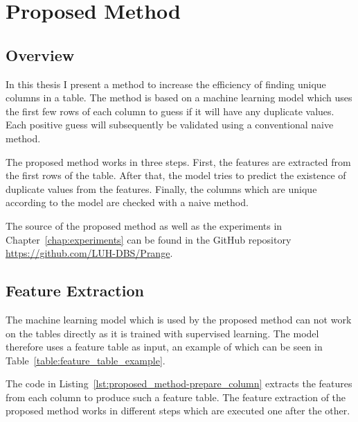\chapter{Proposed Method}\label{chap:proposed_method}
\section{Overview}\label{sec:overview}
In this thesis I present a method to increase the efficiency of finding unique columns in a table. The method is based on a machine learning model which uses the first few rows of each column to guess if it will have any duplicate values. Each positive guess will subsequently be validated using a conventional naive method.

The proposed method works in three steps. First, the features are extracted from the first rows of the table. After that, the model tries to predict the existence of duplicate values from the features. Finally, the columns which are unique according to the model are checked with a naive method.

The source of the proposed method as well as the experiments in Chapter~\ref{chap:experiments} can be found in the GitHub repository \url{https://github.com/LUH-DBS/Prange}. %

\section{Feature Extraction}\label{sec:extracted_features}
The machine learning model which is used by the proposed method can not work on the tables directly as it is trained with supervised learning. The model therefore uses a feature table as input, an example of which can be seen in Table~\ref{table:feature_table_example}.




The code in Listing~\ref{lst:proposed_method-prepare_column} extracts the features from each column to produce such a feature table. The feature extraction of the proposed method works in different steps which are executed one after the other.

